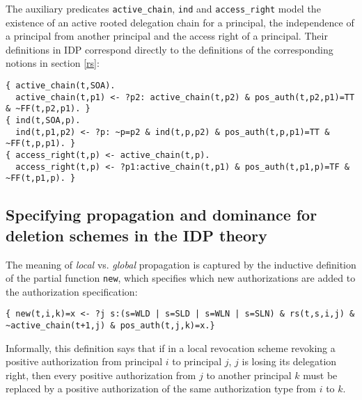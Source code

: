 \documentclass[runningheads]{llncs}
\begin{document}
The auxiliary predicates \texttt{active\_{}chain}, \texttt{ind} and \texttt{access\_{}right} model the existence of an active rooted delegation chain for a principal, the independence of a principal from another principal and the access right of a principal. Their definitions in IDP correspond directly to the definitions of the corresponding notions in section \ref{rs}:
\begin{lstlisting}[caption={The definitions of the auxiliary predicates},label={auxiliary}]
{ active_chain(t,SOA).
  active_chain(t,p1) <- ?p2: active_chain(t,p2) & pos_auth(t,p2,p1)=TT & ~FF(t,p2,p1). }
{ ind(t,SOA,p).
  ind(t,p1,p2) <- ?p: ~p=p2 & ind(t,p,p2) & pos_auth(t,p,p1)=TT & ~FF(t,p,p1). }
{ access_right(t,p) <- active_chain(t,p).
  access_right(t,p) <- ?p1:active_chain(t,p1) & pos_auth(t,p1,p)=TF & ~FF(t,p1,p). }	
\end{lstlisting}

\subsection{Specifying propagation and dominance for deletion schemes in the IDP theory}
The meaning of \emph{local} vs. \emph{global} propagation is captured by the inductive definition of the partial function \texttt{new}, which specifies which new authorizations are added to the authorization specification:
\begin{lstlisting}[caption={The definition of \texttt{new} captures the propagation dimension},label={new}]
{ new(t,i,k)=x <- ?j s:(s=WLD | s=SLD | s=WLN | s=SLN) & rs(t,s,i,j) & ~active_chain(t+1,j) & pos_auth(t,j,k)=x.}
\end{lstlisting}
Informally, this definition says that if in a local revocation scheme revoking a positive authorization from principal $i$ to principal $j$, $j$ is losing its delegation right, then every positive authorization from $j$ to another principal $k$ must be replaced by a positive authorization of the same authorization type  from $i$ to $k$. 
\end{document}
